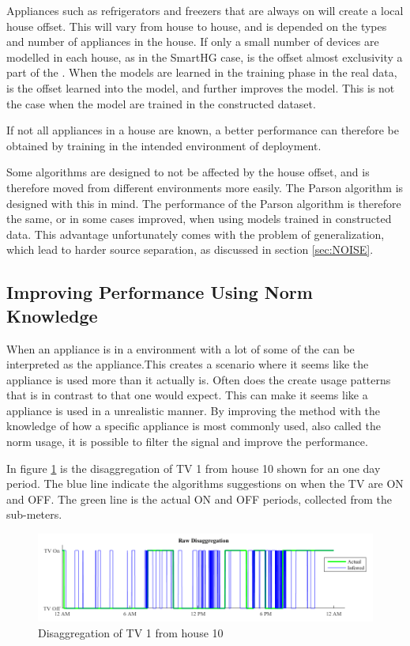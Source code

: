 Appliances such as refrigerators and freezers that are always on will create a local house offset. This will vary from house to house, and is depended on the types and number of appliances in the house. If only a small number of devices are modelled in each house, as in the SmartHG case, is the offset almost exclusivity a part of the . When the models are learned in the training phase in the real data, is the offset learned into the model, and further improves the model. This is not the case when the model are trained in the constructed dataset. 

If not all appliances in a house are known, a better performance can therefore be obtained by training in the intended environment of deployment. 

Some algorithms are designed to not be affected by the house offset, and is therefore moved from different environments more easily. The Parson algorithm is designed with this in mind. The performance of the Parson algorithm is therefore the same, or in some cases improved, when using models trained in constructed data. This advantage unfortunately comes with the problem of generalization, which lead to harder source separation, as discussed in section \ref{sec:NOISE}. 

\subsection{Improving Performance Using Norm Knowledge }
\label{sec:NormFilter}
When an appliance is in a environment with a lot of  some of the  can be interpreted as the appliance.This  creates a scenario where it seems like the appliance is used more than it actually is. Often does the  create usage patterns that is in contrast to that one would expect. This can make it seems like a appliance is used in a unrealistic manner. By improving the method with the knowledge of how a specific appliance is most commonly used, also called the norm usage, it is possible to filter the signal and improve the performance. 

In figure \ref{fig:Norm1} is the disaggregation of TV 1 from house 10 shown for an one day period. The blue line indicate the  algorithms suggestions on when the TV are ON and OFF. The green line is the actual ON and OFF periods, collected from the sub-meters. 

\begin{figure}[H]
\centering
\includegraphics[width=1\textwidth]{billeder/AppNormFilterH10_1.png}
\caption{Disaggregation of TV 1 from house 10}
\label{fig:Norm1}
\end{figure}

